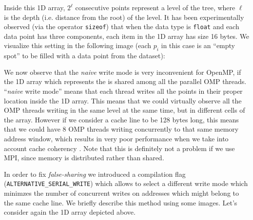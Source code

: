 \documentclass{article}
\begin{document}
Inside this 1D array, $2^\ell$ consecutive points represent a level of the
tree, where $\ell$ is the depth (i.e. distance from the root) of the level.
It has been experimentally observed (via the operator \texttt{sizeof}) that when
the data type is \texttt{float} and each data point has three components, each
item in the 1D array has size 16 bytes. We visualize this setting in the
following image (each $p_i$ in this case is an ``empty spot'' to be filled with
a data point from the dataset):

\begin{figure}[H]
    \centering
\end{figure}

We now observe that the \emph{naive} write mode is very inconvenient for OpenMP,
if the 1D array which represents the \kdtree{} is shared among all the parallel
OMP threads. ``\emph{naive} write mode'' means that each thread writes all the
points in their proper location inside the 1D array. This means that we could
virtually observe all the OMP threads writing in the same \kdtree{} level at
the same time, but in different cells of the array. However if we consider
a cache line to be 128 bytes long, this means that we could have 8 OMP threads
writing concurrently to that same memory address window, which results in very
poor performance when we take into account cache coherency
\cite{hager2010introduction}. Note that this is definitely not a problem if we
use MPI, since memory is distributed rather than shared.

In order to fix \emph{false-sharing} we introduced a compilation flag
(\texttt{ALTERNATIVE\_SERIAL\_WRITE}) which allows to select a different write
mode which minimzes the number of concurrent writes on addresses which might
belong to the same cache line. We briefly describe this method using some
images. Let's consider again the 1D array depicted above.
\end{document}
